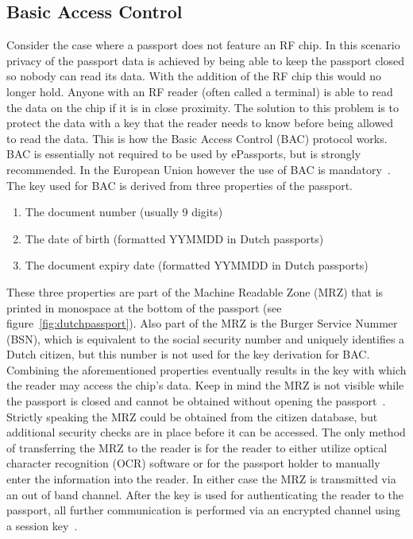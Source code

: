 \subsection{Basic Access Control}
Consider the case where a passport does not feature an RF chip. In this scenario privacy of the passport data is achieved by being able to keep the passport closed so nobody can read its data. With the addition of the RF chip this would no longer hold. Anyone with an RF reader (often called a terminal) is able to read the data on the chip if it is in close proximity. The solution to this problem is to protect the data with a key that the reader needs to know before being allowed to read the data. This is how the Basic Access Control (BAC) protocol works. BAC is essentially not required to be used by ePassports, but is strongly recommended. In the European Union however the use of BAC is mandatory~\cite{icao}. The key used for BAC is derived from three properties of the passport.
\begin{enumerate}
	\item The document number (usually 9 digits)
  \item The date of birth (formatted YYMMDD in Dutch passports)
  \item The document expiry date (formatted YYMMDD in Dutch passports)
\end{enumerate}
These three properties are part of the Machine Readable Zone (MRZ) that is printed in monospace at the bottom of the passport (see figure~\ref{fig:dutchpassport}). Also part of the MRZ is the Burger Service Nummer (BSN), which is equivalent to the social security number and uniquely identifies a Dutch citizen, but this number is not used for the key derivation for BAC. Combining the aforementioned properties eventually results in the key with which the reader may access the chip's data. Keep in mind the MRZ is not visible while the passport is closed and cannot be obtained without opening the passport~\cite{baceacpassports}. Strictly speaking the MRZ could be obtained from the citizen database, but additional security checks are in place before it can be accessed. The only method of transferring the MRZ to the reader is for the reader to either utilize optical character recognition (OCR) software or for the passport holder to manually enter the information into the reader. In either case the MRZ is transmitted via an out of band channel. After the key is used for authenticating the reader to the passport, all further communication is performed via an encrypted channel using a session key~\cite{icao}.


